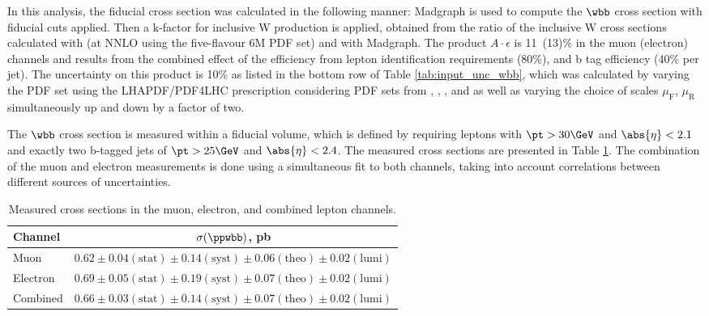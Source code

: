 In this analysis, the fiducial cross section was calculated in the following manner:
 Madgraph is used to compute the $\wbb$ cross section with fiducial cuts applied.
Then a k-factor for inclusive W production is applied, obtained from the ratio
of the inclusive W cross sections calculated with \FEWZ (at NNLO using the five-flavour
\CTEQ6M PDF set) and with Madgraph.
The product $A\cdot\epsilon$ is 11~(13)\% in the
 muon (electron) channels and results from the
 combined effect of the efficiency from
 lepton identification requirements (80\%), and b tag efficiency (40\% per jet).
The uncertainty on this product is 10\% as listed in the bottom row of
 Table \ref{tab:input_unc_wbb}, which was calculated by varying the PDF
 set using the LHAPDF/PDF4LHC \cite{LHAPDF,Botje:2011sn,Alekhin:2011sk,Ball:2012cx}
 prescription considering
 PDF sets from \CTEQ, \MSTW, \NNPDF, and \HERA
 as well as varying the
 choice of scales
 $\mu_{\mathrm{F}}$, $\mu_{\mathrm{R}}$ simultaneously
 up and down by a factor of two.

The $\wbb$ cross section is measured within a fiducial volume, which is defined by
requiring leptons with $\pt > 30\GeV$ and $\abs{\eta}<2.1$ and exactly two b-tagged jets of
 $\pt > 25\GeV$ and $\abs{\eta}<2.4$.
The measured cross sections are presented in Table \ref{tab:crosssections}.
The combination of the muon and electron measurements is done using a simultaneous fit to both channels,
 taking into account correlations between different sources of uncertainties.

\begin{table}[htbp]
\begin{center}
\caption{
 Measured cross sections in the muon, electron, and combined lepton channels.}
\label{tab:crosssections}
 \begin{tabular}{l|c}
 Channel        & $\sigma(\ppwbb)$, pb \\

\hline
     Muon & $  0.62 \pm 0.04 \mathrm{(stat)} \pm 0.14 \mathrm{(syst)} \pm 0.06 \mathrm{(theo)} \pm 0.02 \mathrm{(lumi)} $ \\
 Electron & $  0.69 \pm 0.05 \mathrm{(stat)} \pm 0.19 \mathrm{(syst)} \pm 0.07 \mathrm{(theo)} \pm 0.02 \mathrm{(lumi)} $ \\
 Combined & $  0.66 \pm 0.03 \mathrm{(stat)} \pm 0.14 \mathrm{(syst)} \pm 0.07 \mathrm{(theo)} \pm 0.02 \mathrm{(lumi)} $ \\
 \end{tabular}
\end{center}
\end{table}


